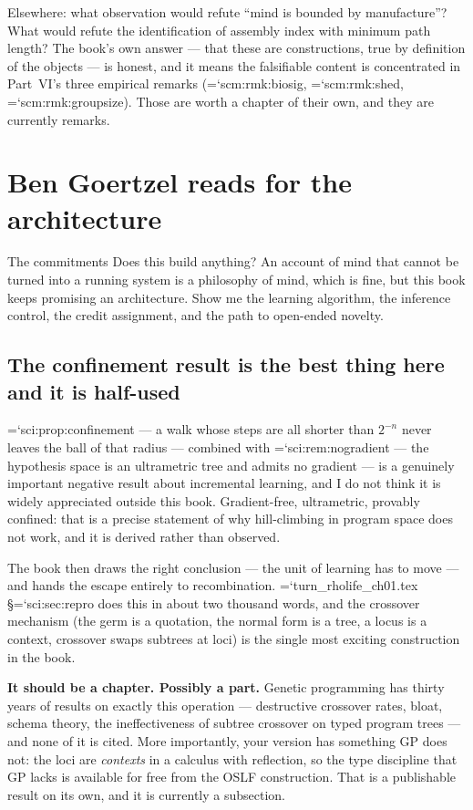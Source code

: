 \documentclass[11pt,letterpaper]{article}
\newcommand{\loc}[1]{{\small\ttfamily\color{accent}\hyphenchar\font=`\-\relax #1}}
\newcommand{\fnd}[1]{\textbf{\color{warn}#1}}
\begin{document}
Elsewhere: what observation would refute ``mind is bounded by
manufacture''? What would refute the identification of assembly index
with minimum path length? The book's own answer --- that these are
constructions, true by definition of the objects --- is honest, and it
means the falsifiable content is concentrated in Part~VI's three
empirical remarks (\loc{scm:rmk:biosig},
\loc{scm:rmk:shed}, \loc{scm:rmk:groupsize}). Those are worth a chapter
of their own, and they are currently remarks.

\section{Ben Goertzel reads for the architecture}

\begin{voice}{The commitments}
Does this build anything? An account of mind that cannot be turned
into a running system is a philosophy of mind, which is fine, but this
book keeps promising an architecture. Show me the learning algorithm,
the inference control, the credit assignment, and the path to
open-ended novelty.
\end{voice}

\subsection*{The confinement result is the best thing here and it is
half-used}

\loc{sci:prop:confinement} --- a walk whose steps are all shorter than
$2^{-n}$ never leaves the ball of that radius --- combined with
\loc{sci:rem:nogradient} --- the hypothesis space is an ultrametric
tree and admits no gradient --- is a genuinely important negative
result about incremental learning, and I do not think it is widely
appreciated outside this book. Gradient-free, ultrametric,
provably confined: that is a precise statement of why hill-climbing in
program space does not work, and it is derived rather than observed.

The book then draws the right conclusion --- the unit of learning has
to move --- and hands the escape entirely to recombination.
\loc{turn\_rholife\_ch01.tex} \S\loc{sci:sec:repro} does this in
about two thousand words, and the crossover mechanism (the germ is a
quotation, the normal form is a tree, a locus is a context, crossover
swaps subtrees at loci) is the single most exciting construction in
the book.

\fnd{It should be a chapter. Possibly a part.} Genetic programming has
thirty years of results on exactly this operation --- destructive
crossover rates, bloat, schema theory, the ineffectiveness of
subtree crossover on typed program trees --- and none of it is cited.
More importantly, your version has something GP does not: the loci are
\emph{contexts} in a calculus with reflection, so the type discipline
that GP lacks is available for free from the OSLF construction. That
is a publishable result on its own, and it is currently a subsection.
\end{document}
